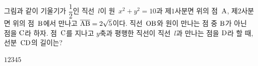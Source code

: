 \noindent\begin{minipage}[t]{0.58\linewidth}\vspace{0pt}\raggedright 그림과 같이 기울기가 $\dfrac12$인 직선~$l$이 원~$x^2+y^2=10$과 제$1$사분면 위의 점~$\mathrm{A}$, 제$2$사분면 위의 점~$\mathrm{B}$에서 만나고 $\overline{\mathrm{AB}}=2\sqrt5$이다. 직선~$\mathrm{OB}$와 원이 만나는 점 중 $\mathrm{B}$가 아닌 점을 $\mathrm{C}$라 하자. 점~$\mathrm{C}$를 지나고 $y$축과 평행한 직선이 직선~$l$과 만나는 점을 $\mathrm{D}$라 할 때, 선분~$\mathrm{CD}$의 길이는? \end{minipage}\hfill\begin{minipage}[t]{0.4\linewidth}\vspace{0pt}\centering \resizebox{\ifdim\width>\linewidth\linewidth\else\width\fi}{!}{}\end{minipage}\par
\begin{choices32}{$1$}{$2$}{$3$}{$4$}{$5$}\end{choices32}
